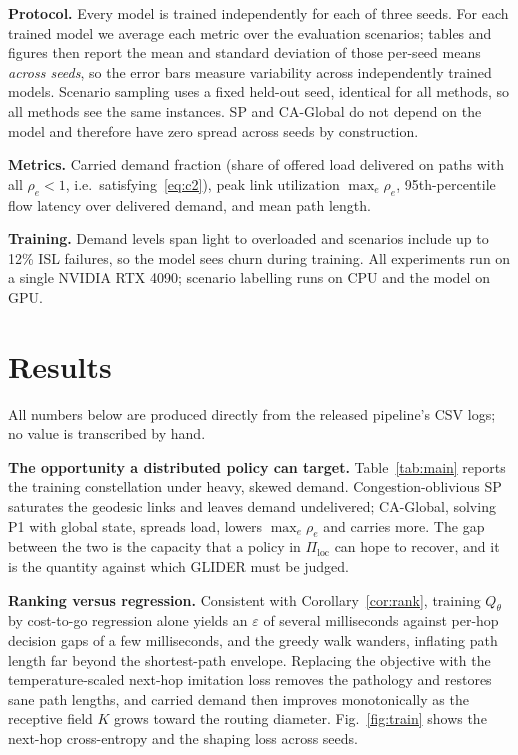 \documentclass[conference]{IEEEtran}
\begin{document}
\textbf{Protocol.} Every model is trained independently for each of three seeds. For each trained model we average each metric over the evaluation scenarios; tables and figures then report the mean and standard deviation of those per-seed means \emph{across seeds}, so the error bars measure variability across independently trained models. Scenario sampling uses a fixed held-out seed, identical for all methods, so all methods see the same instances. SP and CA-Global do not depend on the model and therefore have zero spread across seeds by construction.

\textbf{Metrics.} Carried demand fraction (share of offered load delivered on paths with all $\rho_e<1$, i.e.\ satisfying~\eqref{eq:c2}), peak link utilization $\max_e\rho_e$, 95th-percentile flow latency over delivered demand, and mean path length.

\textbf{Training.} Demand levels span light to overloaded and scenarios include up to 12\% ISL failures, so the model sees churn during training. All experiments run on a single NVIDIA RTX 4090; scenario labelling runs on CPU and the model on GPU.

\section{Results}\label{sec:results}
All numbers below are produced directly from the released pipeline's CSV logs; no value is transcribed by hand.

\textbf{The opportunity a distributed policy can target.} Table~\ref{tab:main} reports the training constellation under heavy, skewed demand. Congestion-oblivious SP saturates the geodesic links and leaves demand undelivered; CA-Global, solving P1 with global state, spreads load, lowers $\max_e\rho_e$ and carries more. The gap between the two is the capacity that a policy in $\Pi_{\mathrm{loc}}$ can hope to recover, and it is the quantity against which GLIDER must be judged.

\begin{table}[t]
\centering
\caption{In-distribution routing on the \emph{medium} constellation under heavy skewed demand. Mean $\pm$ std across independently trained seeds. CA-Global is centralized (not in $\Pi_{\mathrm{loc}}$) and bounds what a distributed policy can recover.}
\label{tab:main}
\small

\end{table}

\textbf{Ranking versus regression.} Consistent with Corollary~\ref{cor:rank}, training $Q_\theta$ by cost-to-go regression alone yields an $\varepsilon$ of several milliseconds against per-hop decision gaps of a few milliseconds, and the greedy walk wanders, inflating path length far beyond the shortest-path envelope. Replacing the objective with the temperature-scaled next-hop imitation loss removes the pathology and restores sane path lengths, and carried demand then improves monotonically as the receptive field $K$ grows toward the routing diameter. Fig.~\ref{fig:train} shows the next-hop cross-entropy and the shaping loss across seeds.
\end{document}
